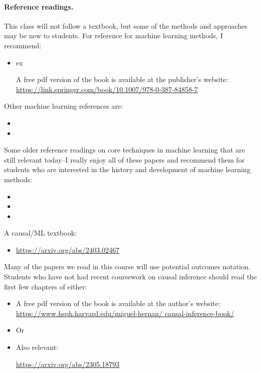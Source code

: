 \documentclass[letterpaper, 12pt, parskip=full,DIV=10]{scrartcl}
\begin{document}
\paragraph{Reference readings.}
This class will not follow a textbook, but some of the methods and approaches may be new to students. For reference for machine learning methods, I recommend:
\begin{itemize}
\item {}  ex

A free pdf version of the book is available at the publisher's website: \url{https://link.springer.com/book/10.1007/978-0-387-84858-7}
\end{itemize}


Other machine learning references are:
\begin{itemize}
\item {}
\item {}
\end{itemize}

Some older reference readings on core techniques in machine learning that are still relevant today--I really enjoy all of these papers and recommend them for students who are interested in the history and development of machine learning methods:
\begin{itemize}
  \item {}
  \item {}
  \item {}
\end{itemize}

A causal/{ML} textbook:
\begin{itemize}
\item {}

\url{https://arxiv.org/abs/2403.02467}
\end{itemize}

Many of the papers we read in this course will use potential outcomes notation. Students who have not had recent coursework on causal inference should read the first few chapters of either:
\begin{itemize}
\item
{}

A free pdf version of the book is available at the author's website: \url{https://www.hsph.harvard.edu/miguel-hernan/
causal-inference-book/}
\item 
Or\\
\item Also relevant:\\

\url{https://arxiv.org/abs/2305.18793}
\end{itemize}
\end{document}
